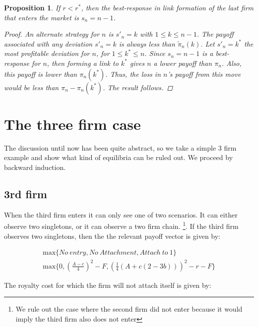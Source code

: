\documentclass{article}
\newtheorem{proposition}{Proposition}
\begin{document}
\begin{proposition}
If $r<r^*$, then the best-response in link formation of the last firm that enters the market is $s_n=n-1$.  
\begin{proof}
An alternate strategy for $n$ is $s'_n=k$ with $1\leq k\leq n-1 $. The payoff associated with any deviation $s'_n=k$ is always less than $\tilde{\pi}_n(k)$. Let $s'_n=k^*$ the most profitable deviation for $n$, for $1\leq k^*\leq n$. Since $s_n=n-1$ is a best-response for $n$, then forming a link to $k^*$ gives $n$ a lower payoff than $\pi_n$. Also, this payoff is lower than $\pi_n(k^*)$. Thus, the loss in $n$'s payoff from this move would be less than $\pi_n-\pi_n(k^*)$. The result follows.   
\end{proof}
\end{proposition}













\section{The three firm case}

The discussion until now has been quite abstract, so we take a simple 3 firm example and show what kind of equilibria can be ruled out. We proceed by backward induction. 


\subsection{3rd firm}
When the third firm enters it can only see one of two scenarios. It can either observe two singletons, or it can observe a two firm chain. \footnote{We rule out the case where the second firm did not enter because it would imply the third firm also does not enter}.  If the third firm observes two singletons, then the the relevant payoff vector is given by:

\begin{align*}
& \text{max} 
\{ No~ entry,
No~ Attachment, 
Attach~ to~1
\}& \\
& \text{max} 
\{ 0,
\left(\frac{A-c}{4}\right)^2-F, 
 \left( \frac{1}{4}(A+c(2-3b))\right)^2-r-F
\} &
\end{align*}

The royalty cost for which the firm will not attach itself is given by:
\end{document}
